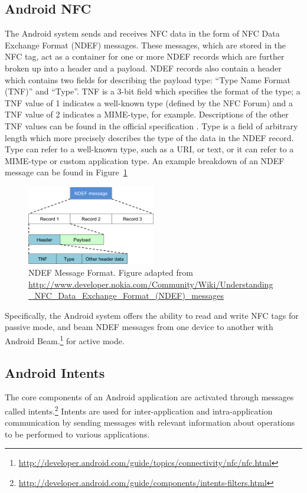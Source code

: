 \documentclass[12pt]{article}
\begin{document}
\subsection{Android NFC}
The Android system sends and receives NFC data in the form of NFC Data Exchange Format (NDEF) messages.
These messages, which are stored in the NFC tag, act as a container for one or more NDEF records which are further broken up into a header and a payload.
NDEF records also contain a header which contains two fields for describing the payload type: ``Type Name Format (TNF)'' and ``Type''.
TNF is a 3-bit field which specifies the format of the type; a TNF value of 1 indicates a well-known type (defined by the NFC Forum) and a TNF value of 2 indicates a MIME-type, for example.
Descriptions of the other TNF values can be found in the official specification \cite{ndef}.
Type is a field of arbitrary length which more precisely describes the type of the data in the NDEF record.
Type can refer to a well-known type, such as a URI, or text, or it can refer to a MIME-type or custom application type.
An example breakdown of an NDEF message can be found in Figure~\ref{fig:background:ndef}

\begin{figure}[h!]
	\centering
		\includegraphics[width=0.5\textwidth]{NDEF_Format.png}
	\caption[Caption for LOF]%
		{NDEF Message Format. Figure adapted from \\{\scriptsize\url{http://www.developer.nokia.com/Community/Wiki/Understanding_NFC_Data_Exchange_Format_(NDEF)_messages}}}
  \label{fig:background:ndef}

\end{figure}

Specifically, the Android system offers the ability to read and write NFC tags for passive mode, and beam NDEF messages from one device to another with Android Beam.\footnote{\url{http://developer.android.com/guide/topics/connectivity/nfc/nfc.html}} for active mode. 

\subsection{Android Intents}
\label{sec:background:intents}
The core components of an Android application are activated through messages called intents.\footnote{\url{http://developer.android.com/guide/components/intents-filters.html}}
Intents are used for inter-application and intra-application communication by sending messages with relevant information about operations to be performed to various applications.  
\end{document}

